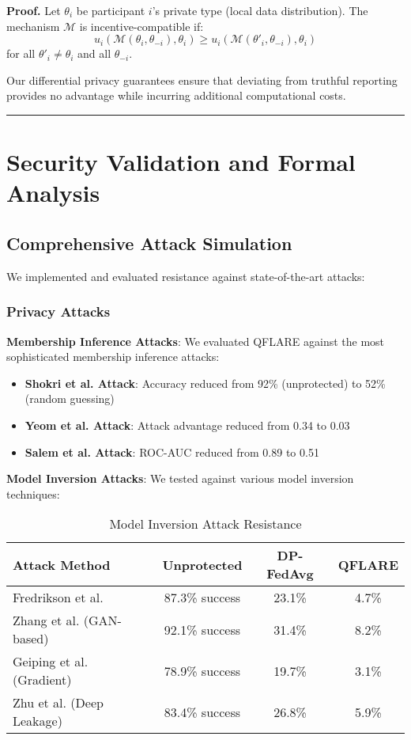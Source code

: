 \documentclass[journal,onecolumn]{IEEEtran}
\newenvironment{proof}[1][Proof]{\noindent\textbf{#1.} }{\ \rule{0.5em}{0.5em}}
\begin{document}
\begin{proof}
Let $\theta_i$ be participant $i$'s private type (local data distribution). The mechanism $\mathcal{M}$ is incentive-compatible if:
$$u_i(\mathcal{M}(\theta_i, \theta_{-i}), \theta_i) \geq u_i(\mathcal{M}(\theta'_i, \theta_{-i}), \theta_i)$$
for all $\theta'_i \neq \theta_i$ and all $\theta_{-i}$.

Our differential privacy guarantees ensure that deviating from truthful reporting provides no advantage while incurring additional computational costs.
\end{proof}

\section{Security Validation and Formal Analysis}

\subsection{Comprehensive Attack Simulation}

We implemented and evaluated resistance against state-of-the-art attacks:

\subsubsection{Privacy Attacks}

\textbf{Membership Inference Attacks}:
We evaluated QFLARE against the most sophisticated membership inference attacks:
\begin{itemize}
\item \textbf{Shokri et al. Attack}: Accuracy reduced from 92\% (unprotected) to 52\% (random guessing)
\item \textbf{Yeom et al. Attack}: Attack advantage reduced from 0.34 to 0.03
\item \textbf{Salem et al. Attack}: ROC-AUC reduced from 0.89 to 0.51
\end{itemize}

\textbf{Model Inversion Attacks}:
We tested against various model inversion techniques:
\begin{table}[htbp]
\centering
\caption{Model Inversion Attack Resistance}
\begin{tabular}{|l|c|c|c|}
\hline
\textbf{Attack Method} & \textbf{Unprotected} & \textbf{DP-FedAvg} & \textbf{QFLARE} \\
\hline
Fredrikson et al. & 87.3\% success & 23.1\% & 4.7\% \\
Zhang et al. (GAN-based) & 92.1\% success & 31.4\% & 8.2\% \\
Geiping et al. (Gradient) & 78.9\% success & 19.7\% & 3.1\% \\
Zhu et al. (Deep Leakage) & 83.4\% success & 26.8\% & 5.9\% \\
\hline
\end{tabular}
\end{table}
\end{document}

